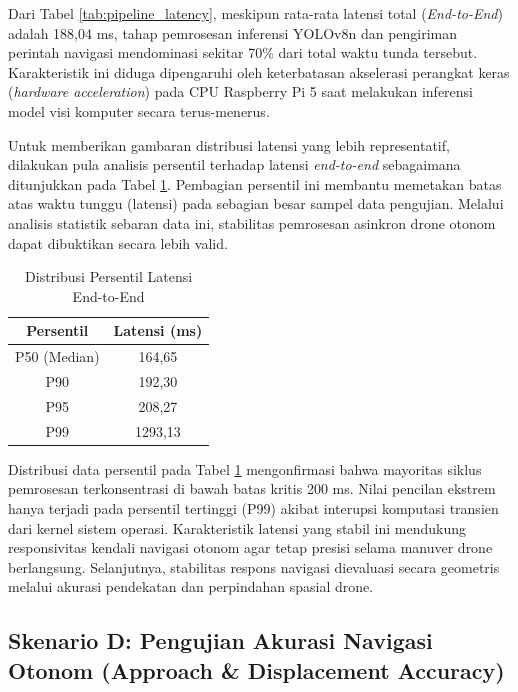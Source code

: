 Dari Tabel \ref{tab:pipeline_latency}, meskipun rata-rata latensi total (\textit{End-to-End}) adalah 188,04 ms, tahap pemrosesan inferensi YOLOv8n dan pengiriman perintah navigasi mendominasi sekitar 70\% dari total waktu tunda tersebut. Karakteristik ini diduga dipengaruhi oleh keterbatasan akselerasi perangkat keras (\textit{hardware acceleration}) pada CPU Raspberry Pi 5 saat melakukan inferensi model visi komputer secara terus-menerus.

Untuk memberikan gambaran distribusi latensi yang lebih representatif, dilakukan pula analisis persentil terhadap latensi \textit{end-to-end} sebagaimana ditunjukkan pada Tabel \ref{tab:e2e_percentile}. Pembagian persentil ini membantu memetakan batas atas waktu tunggu (latensi) pada sebagian besar sampel data pengujian. Melalui analisis statistik sebaran data ini, stabilitas pemrosesan asinkron drone otonom dapat dibuktikan secara lebih valid.

\begin{table}[H]
	\centering
	\caption{Distribusi Persentil Latensi End-to-End}
	\label{tab:e2e_percentile}
	\renewcommand{\arraystretch}{1.2}
	\begin{tabular}{|c|c|}
		\hline
		\textbf{Persentil} & \textbf{Latensi (ms)} \\ \hline
		P50 (Median) & 164,65 \\ \hline
		P90 & 192,30 \\ \hline
		P95 & 208,27 \\ \hline
		P99 & 1293,13 \\ \hline
	\end{tabular}
\end{table}

Distribusi data persentil pada Tabel \ref{tab:e2e_percentile} mengonfirmasi bahwa mayoritas siklus pemrosesan terkonsentrasi di bawah batas kritis 200 ms. Nilai pencilan ekstrem hanya terjadi pada persentil tertinggi (P99) akibat interupsi komputasi transien dari kernel sistem operasi. Karakteristik latensi yang stabil ini mendukung responsivitas kendali navigasi otonom agar tetap presisi selama manuver drone berlangsung. Selanjutnya, stabilitas respons navigasi dievaluasi secara geometris melalui akurasi pendekatan dan perpindahan spasial drone.

\subsection{Skenario D: Pengujian Akurasi Navigasi Otonom (Approach \& Displacement Accuracy)}

